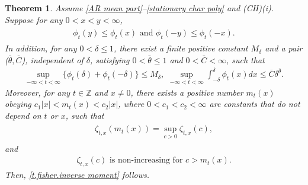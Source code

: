 \documentclass[ejsv2]{imsart}
\theoremstyle{plain}
\newtheorem{theorem}{Theorem}[section]
\theoremstyle{definition}
\theoremstyle{remark}
\begin{document}
\begin{theorem}\label{tfisher}
Assume \eqref{AR mean part}--\eqref{stationary char poly}
and {\rm (CH)(i)}. 
Suppose for any 
$0< x< y<\infty$, %
\begin{align}\label{zt density}
\begin{split}
\phi_t(y)\leq \phi_t(x)\,\,\mbox{and}\,\,\phi_t(-y)\leq \phi_t(-x).
\end{split}
\end{align}
In addition, 
for any $0<\delta \leq 1$, there exist a
finite positive constant $M_\delta$
and a pair ($\bar{\theta} ,\bar{C} $), independent of $\delta$, satisfying $0<\bar{\theta} \leq 1$ and $0<\bar{C}<\infty$,
such that
\begin{eqnarray}
\label{ing104}
\sup_{-\infty<t<\infty}\{\phi_t(\delta)+\phi_t(-\delta)\}\leq M_\delta,\,\,\sup_{-\infty<t<\infty}
\int_{-\delta}^{\delta}\phi_t(x)dx\leq\bar{C}\delta^{\bar{\theta}}.
\end{eqnarray}
Moreover, for any $t\in \mathbb{Z}$ and $x \neq 0$, there exists
a positive number $m_t(x)$ obeying $c_1|x| < m_t(x)< c_2|x|$, 
where $0<c_1<c_2<\infty$ are constants that do not depend on $t$ or $x$, such that
\begin{align}
\begin{split}
\label{zt density 0}
\zeta_{t,x}(m_t(x))=\sup_{c>0} \zeta_{t,x}(c),
\end{split}
\end{align}
and 
\begin{equation}
\label{zt density 2}
\begin{split}
\zeta_{t,x}(c) \,\,\mbox{is non-increasing for} \,\,
c>m_t(x).
\end{split}
\end{equation}
Then, \eqref{t.fisher.inverse moment} follows.
\end{theorem}
\end{document}
